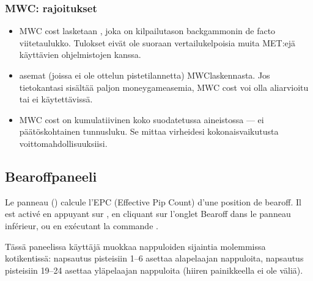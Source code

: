 \documentclass[letterpaper,10pt,finnish]{sphinxmanual}
\begin{document}
\subsubsection{MWC: rajoitukset}
\label{\detokenize{manuel:mwc-limitations}}\begin{itemize}
\item {} 
\sphinxAtStartPar
MWC cost lasketaan , joka on kilpailutason backgammonin de facto \sphinxhyphen{}viitetaulukko. Tulokset eivät ole suoraan vertailukelpoisia muita MET:ejä käyttävien ohjelmistojen kanssa.

\item {} 
\sphinxAtStartPar
{} \sphinxhyphen{}asemat (joissa ei ole ottelun pistetilannetta)  MWC\sphinxhyphen{}laskennasta. Jos tietokantasi sisältää paljon money\sphinxhyphen{}game\sphinxhyphen{}asemia, MWC cost voi olla aliarvioitu tai ei käytettävissä.

\item {} 
\sphinxAtStartPar
MWC cost on kumulatiivinen koko suodatetussa aineistossa — ei päätöskohtainen tunnusluku. Se mittaa virheidesi kokonaisvaikutusta voittomahdollisuuksiisi.

\end{itemize}


\subsection{Bearoff\sphinxhyphen{}paneeli}
\label{\detokenize{manuel:panneau-bearoff}}\label{\detokenize{manuel:panneau-epc}}
\sphinxAtStartPar
Le panneau  () calcule l’EPC (Effective Pip Count) d’une
position de bearoff. Il est activé en appuyant sur , en cliquant sur
l’onglet Bearoff dans le panneau inférieur, ou en exécutant la commande
.

\sphinxAtStartPar
Tässä paneelissa käyttäjä muokkaa nappuloiden sijaintia molemmissa kotikentissä: napsautus pisteisiin 1–6 asettaa alapelaajan nappuloita, napsautus pisteisiin 19–24 asettaa yläpelaajan nappuloita (hiiren painikkeella ei ole väliä).
\end{document}
